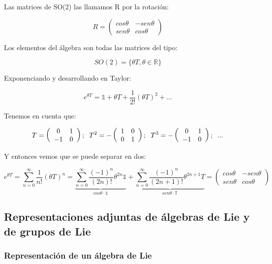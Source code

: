 Las matrices de SO(2) las llamamos R por la rotación:

$$R= \left ( \begin{array}{cc}
 cos \theta & -sen \theta \\
sen \theta  & cos \theta
\end{array}\right)$$

Los elementos del álgebra son todas las matrices del tipo:

$$SO(2)=\lbrace \theta T , \theta \in \mathds{R} \rbrace$$

Exponenciando y desarrollando en Taylor:

$$e^{\theta T}= \mathds{1} + \theta T + \frac{1}{2!}(\theta T)^2 + ...$$

Tenemos en cuenta que:

$$T=\left ( \begin{array}{cc}
 0 &  1\\
 -1 & 0
\end{array}\right); \hspace{0.2cm} T^2=-\left ( \begin{array}{cc}
 1 &  0\\
 0 & 1
\end{array}\right); \hspace{0.2cm} T^3=-\left ( \begin{array}{cc}
 0 &  1\\
 -1 & 0
\end{array}\right); \hspace{0.2cm} ...$$

Y entonces vemos que se puede separar en dos:

$$e^{\theta T}=\sum _{n=0}^\infty \frac{1}{n!} (\theta T)^n = \underbrace{\sum _{n=0}^\infty \frac{(-1)^{n}}{(2n)!}\theta ^{2n} \mathds{1}}_{cos \theta \cdot \mathds{1}} + \underbrace{ \sum _{n=0}^\infty \frac{(-1)^{n}}{(2n+1)!}\theta ^{2n+1} T}_{sen \theta \cdot \mathds{T}}= \left ( \begin{array}{cc}
 cos \theta & -sen \theta \\
sen \theta  & cos \theta
\end{array}\right) $$


\subsection{Representaciones adjuntas de álgebras de Lie y de grupos de Lie}

\subsubsection{Representación de un álgebra de Lie}

